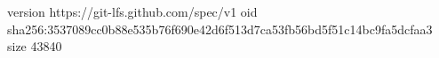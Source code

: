 version https://git-lfs.github.com/spec/v1
oid sha256:3537089cc0b88e535b76f690e42d6f513d7ca53fb56bd5f51c14bc9fa5dcfaa3
size 43840
